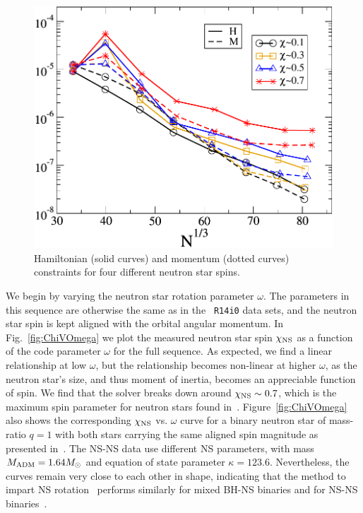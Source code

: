 \begin{figure}
\centerline{\includegraphics[scale=0.95]{chap4/OmegaSeqHamMom}}
\caption[Constraints for the $\chi_{\rm NS}$ sequence.]{\label{fig:OmegaSeqHamMom} Hamiltonian (solid curves) and
momentum (dotted curves) constraints for four different neutron star spins.}
\end{figure}

We begin by varying the neutron star rotation parameter $\omega$. The
parameters in this sequence are otherwise the same as in the {\tt
  R14i0} data sets, and the neutron star spin is kept aligned with the
orbital angular momentum. In Fig.~\ref{fig:ChiVOmega} we plot the
measured neutron star spin $\chi_{\rm NS}$ as a function of the code
parameter $\omega$ for the full sequence. As expected, we find a
linear relationship at low $\omega$, but the relationship becomes
non-linear at higher $\omega$, as the neutron star's size, and thus
moment of inertia, becomes an appreciable function of spin. We find
that the solver breaks down around $\chi_{\rm NS}\sim 0.7$, which is the
maximum spin parameter for neutron stars found in~\cite{Lo:2010bj}. Figure~\ref{fig:ChiVOmega} also shows the
corresponding $\chi_{\rm NS}$ vs. $\omega$ curve for a binary neutron
star of mass-ratio $q=1$ with both stars carrying the same aligned
spin magnitude as presented in~\cite{Tacik:2015tja}. The NS-NS data
use different NS parameters, with mass $M_{\rm ADM}=1.64M_{\odot}$ and
equation of state parameter $\kappa=123.6$. Nevertheless, the curves
remain very close to each other in shape, indicating that the method
to impart NS rotation~\citep{Tichy:2011gw} performs similarly for mixed
BH-NS binaries and for NS-NS binaries~\citep{Tacik:2015tja}.


